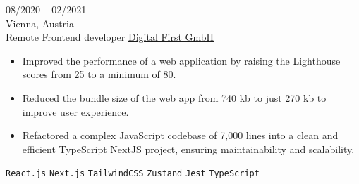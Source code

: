 \entry
{08/2020 -- 02/2021 \\ Vienna, Austria \\ Remote}
{Frontend developer}
{\href{https://dfirst.eu/}{Digital First GmbH}}
{\vspace{-10pt}
    \begin{itemize}[noitemsep,topsep=0pt,parsep=0pt,partopsep=0pt, leftmargin=-1pt]
        \item Improved the performance of a web application by raising the Lighthouse scores from 25 to a minimum of 80.
        \item Reduced the bundle size of the web app from 740 kb to just 270 kb to improve user experience.
        \item Refactored a complex JavaScript codebase of 7,000 lines into a clean and efficient TypeScript NextJS project, ensuring maintainability and scalability.
    \end{itemize}
    \texttt{React.js} \slashsep \texttt{Next.js} \slashsep \texttt{TailwindCSS} \slashsep \texttt{Zustand} \slashsep \texttt{Jest} \slashsep \texttt{TypeScript}
}
